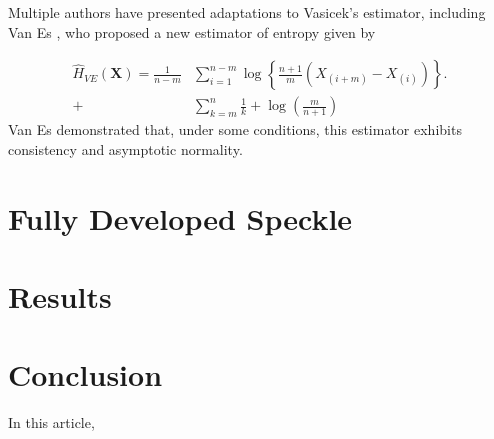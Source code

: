 \documentclass[conference]{IEEEtran}
\begin{document}
Multiple authors have presented  adaptations to Vasicek's estimator, including Van Es \cite{Bert1992}, who proposed a new estimator of entropy given by
 
\begin{align}
	\widehat{H}_{VE}(\bm{X})=\frac{1}{n-m}&\sum_{i=1}^{n-m}\log\left\{\frac{n+1}{m}\left(X_{(i+m)}-X_{(i)}\right)\right\}.\\
	+&\sum_{k=m}^n\frac{1}{k}+\log\left(\frac{m}{n+1}\right)\nonumber
\end{align}
Van Es demonstrated that, under some conditions, this estimator exhibits consistency and asymptotic normality.


\section{Fully Developed Speckle}

\section{Results}

\section{Conclusion}\label{sec_09}

In this article, 


%


\end{document}
